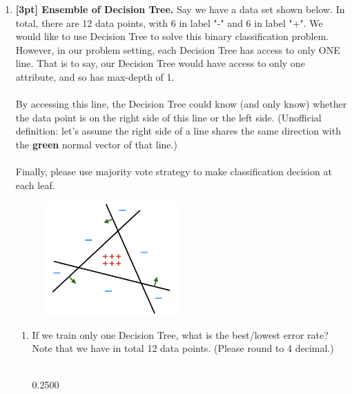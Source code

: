 \begin{enumerate}
    \item \textbf{[3pt] Ensemble of Decision Tree.} Say we have a data set shown below. In total, there are 12 data points, with 6 in label "-" and 6 in label "+". We would like to use Decision Tree to solve this binary classification problem. However, in our problem setting, each Decision Tree has access to only ONE line. That is to say, our Decision Tree would have access to only one attribute, and so has max-depth of 1. \\ \\
    By accessing this line, the Decision Tree could know (and only know) whether the data point is on the right side of this line or the left side. (Unofficial definition: let's assume the right side of a line shares the same direction with the \textcolor{OliveGreen}{\textbf{green}} normal vector of that line.) \\ \\
    Finally, please use majority vote strategy to make classification decision at each leaf.\\
    
    \begin{figure}[H]
        \centering
        \includegraphics[width = 0.5\textwidth]{ensemble_dt.png}
        \label{Q_ensemble_DT}
    \end{figure}
    
    \begin{enumerate}
        \item  If we train only one Decision Tree, what is the best/lowest error rate? Note that we have in total 12 data points. (Please round to 4 decimal.) \\ \\
    \begin{tcolorbox}[fit,height=1cm, width=15cm, blank, borderline={1pt}{-2pt}, nobeforeafter]
    \begin{center}\huge0.2500\end{center}
    \end{tcolorbox} 
    

\end{enumerate}
\end{enumerate}
